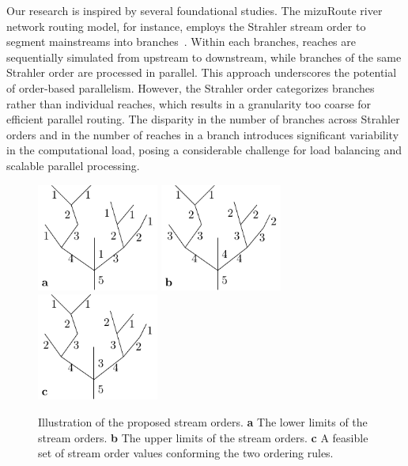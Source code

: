 \documentclass[water,article,submit,pdftex,moreauthors]{Definitions/mdpi}
\begin{document}
Our research is inspired by several foundational studies. The mizuRoute river network routing model, for instance, employs the Strahler stream order to segment mainstreams into branches~\cite{mizukami2021JAMES}. Within each branches, reaches are sequentially simulated from upstream to downstream, while branches of the same Strahler order are processed in parallel. This approach underscores the potential of order-based parallelism. However, the Strahler order categorizes branches rather than individual reaches, which results in a granularity too coarse for efficient parallel routing. The disparity in the number of branches across Strahler orders and in the number of reaches in a branch introduces significant variability in the computational load, posing a considerable challenge for load balancing and scalable parallel processing.

\begin{figure}[H]
	\includegraphics[width=4cm]{fig/stream_order.pdf}
	\hspace{0.5cm}
	\includegraphics[width=4cm]{fig/stream_order_r.pdf}
	\hspace{0.5cm}
	\includegraphics[width=4cm]{fig/stream_order_a.pdf}
	\caption{Illustration of the proposed stream orders. \textbf{a} The lower limits of the stream orders. \textbf{b} The upper limits of the stream orders. \textbf{c} A feasible set of stream order values conforming the two ordering rules. \label{fig:zheng_order}}
\end{figure}
\end{document}
